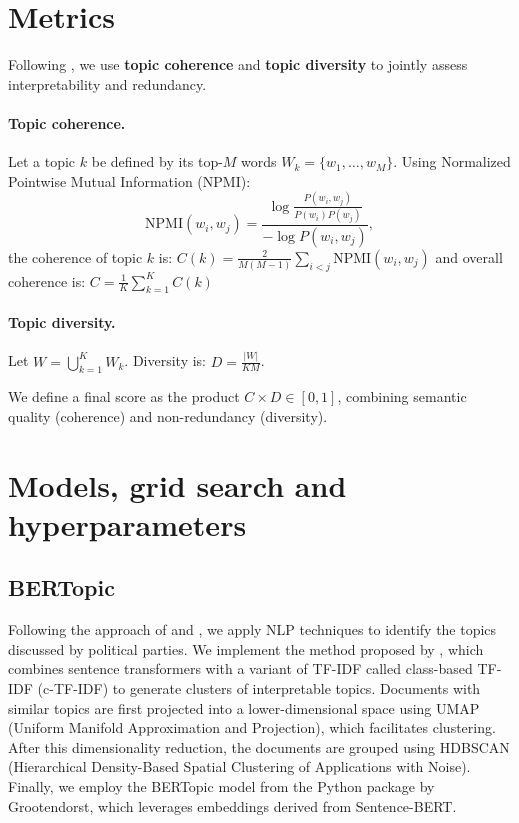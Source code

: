 \documentclass{article}
\begin{document}
\section{Metrics}

Following \citet{grootendorst2022bertopic}, we use \textbf{topic coherence} and \textbf{topic diversity} to jointly assess interpretability and redundancy.

\paragraph{Topic coherence.}
Let a topic $k$ be defined by its top-$M$ words $W_k = \{w_1, \dots, w_M\}$. Using Normalized Pointwise Mutual Information (NPMI):
\begin{equation}
\text{NPMI}(w_i, w_j) = \frac{\log \frac{P(w_i, w_j)}{P(w_i)P(w_j)}}{-\log P(w_i, w_j)},
\end{equation}
the coherence of topic $k$ is: $C(k) = \frac{2}{M(M-1)} \sum_{i<j} \text{NPMI}(w_i, w_j)$
and overall coherence is: $C = \frac{1}{K} \sum_{k=1}^K C(k)$


\paragraph{Topic diversity.}
Let $W = \bigcup_{k=1}^K W_k$. Diversity is: $D = \frac{|W|}{KM}$.

We define a final score as the product $C \times D \in [0,1]$, combining semantic quality (coherence) and non-redundancy (diversity).

\section{Models, grid search and hyperparameters}

\subsection{BERTopic}
Following the approach of \citet{orellana2023nlp} and \citet{mendonca2024twitterverse}, we apply NLP techniques to identify the topics discussed by political parties. We implement the method proposed by \citet{grootendorst2022bertopic}, which combines sentence transformers with a variant of TF-IDF called class-based TF-IDF (c-TF-IDF) to generate clusters of interpretable topics. Documents with similar topics are first projected into a lower-dimensional space using UMAP (Uniform Manifold Approximation and Projection), which facilitates clustering. After this dimensionality reduction, the documents are grouped using HDBSCAN (Hierarchical Density-Based Spatial Clustering of Applications with Noise). Finally, we employ the BERTopic model from the Python package by Grootendorst, which leverages embeddings derived from Sentence-BERT.
\end{document}
